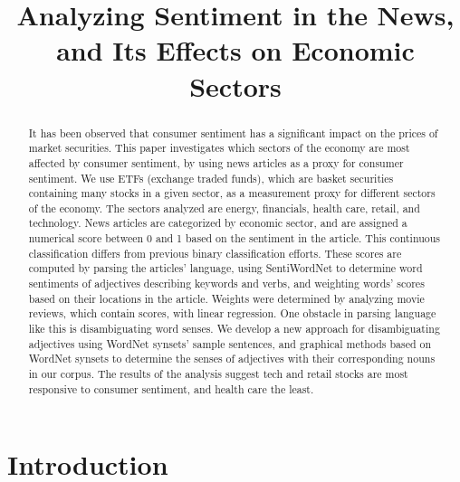 \documentclass[pageno]{jpaper}
\begin{document}
\title{
Analyzing Sentiment in the News, and Its Effects on Economic Sectors}

\date{}
\maketitle
\doublespacing
\pagestyle{plain}
\setcounter{page}{1}

\begin{abstract}
It has been observed that consumer sentiment has a significant impact on the prices of market securities. This paper investigates which sectors of the economy are most affected by consumer sentiment, by using news articles as a proxy for consumer sentiment. We use ETFs (exchange traded funds), which are basket securities containing many stocks in a given sector, as a measurement proxy for different sectors of the economy. The sectors analyzed are energy, financials, health care, retail, and technology. News articles are categorized by economic sector, and are assigned a numerical score between 0 and 1 based on the sentiment in the article. This continuous classification differs from previous binary classification efforts. These scores are computed by parsing the articles' language, using SentiWordNet to determine word sentiments of adjectives describing keywords and verbs, and weighting words' scores based on their locations in the article. Weights were determined by analyzing movie reviews, which contain scores, with linear regression. One obstacle in parsing language like this is disambiguating word senses. We develop a new approach for disambiguating adjectives using WordNet synsets' sample sentences, and graphical methods based on WordNet synsets to determine the senses of adjectives with their corresponding nouns in our corpus. The results of the analysis suggest tech and retail stocks are most responsive to consumer sentiment, and health care the least.
\end{abstract}

\section{Introduction}
\end{document}
